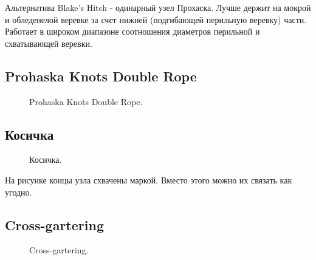 Альтернатива Blake's Hitch - одинарный узел Прохаска. Лучше держит на мокрой и обледенелой веревке за счет нижней (подгибающей перильную веревку) части. Работает в широком диапазоне соотношения диаметров перильной и схватывающей веревки.

\subsection{Prohaska Knots Double Rope}

\begin{figure}[H]\centering
	\begin{minipage}{1\linewidth}
		\begin{center}
			\tcbox[enhanced jigsaw,colframe=black,opacityframe=0.5,opacityback=0.5]
			{\centering{}}
		\end{center}
	\end{minipage}
\caption{Prohaska Knots Double Rope.}
\label{ris:Prohaska_Knots_Double_Rope}
\end{figure}

\subsection{Косичка}

\begin{figure}[H]\centering
	\begin{minipage}{1\linewidth}
		\begin{center}
			\tcbox[enhanced jigsaw,colframe=black,opacityframe=0.5,opacityback=0.5]
			{\centering{}}
		\end{center}
	\end{minipage}
\caption{Косичка.}
\label{ris:Kosichka}
\end{figure}

На рисунке концы узла схвачены маркой. Вместо этого можно их связать как угодно.

\subsection{Cross-gartering}

\begin{figure}[H]\centering
\end{figure}
\begin{figure}[H]\centering
	\caption{Cross-gartering.}\label{ris:cross-gartering}
\end{figure}

